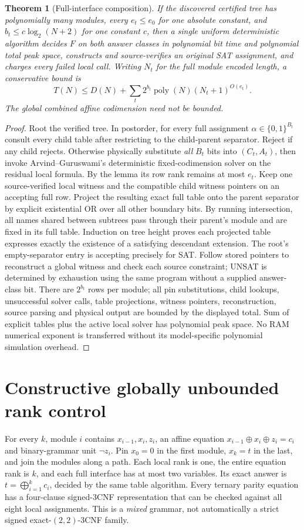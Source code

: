 \documentclass[11pt]{article}
\newtheorem{theorem}{Theorem}
\begin{document}
\begin{theorem}[Full-interface composition]
If the discovered certified tree has polynomially many modules,
every $e_t\le e_0$ for one absolute constant, and
$b_t\le c\log_2(N+2)$ for one constant $c$, then a single uniform
deterministic algorithm decides $F$ on both answer classes in polynomial
bit time and polynomial total peak space, constructs and source-verifies
an original SAT assignment, and charges every failed local call.
Writing $N_t$ for the full module encoded length, a conservative bound is
\[
T(N)\le D(N)+\sum_t 2^{b_t}\operatorname{poly}(N)(N_t+1)^{O(e_t)}.
\]
The global combined affine codimension need not be bounded.
\end{theorem}
\begin{proof}
Root the verified tree. In postorder, for every full assignment
$\alpha\in\{0,1\}^{B_t}$ consult every child table after restricting
to the child-parent separator. Reject if any child rejects. Otherwise
physically substitute \emph{all} $B_t$ bits into $(C_t,A_t)$,
then invoke Arvind--Guruswami's deterministic fixed-codimension solver
on the residual local formula. By the lemma its row rank remains
at most $e_t$. Keep one source-verified local witness and the
compatible child witness pointers on an accepting full row.
Project the resulting exact full table onto the parent separator
by explicit existential OR over all other boundary bits.
By running intersection, all names shared between subtrees pass
through their parent's module and are fixed in its full table.
Induction on tree height proves each projected table expresses
exactly the existence of a satisfying descendant extension.
The root's empty-separator entry is accepting precisely for SAT.
Follow stored pointers to reconstruct a global witness and check
each source constraint; UNSAT is determined by exhaustion using
the same program without a supplied answer-class bit.
There are $2^{b_t}$ rows per module; all pin substitutions,
child lookups, unsuccessful solver calls, table projections,
witness pointers, reconstruction, source parsing and physical
output are bounded by the displayed total. Sum of explicit
tables plus the active local solver has polynomial peak space.
No RAM numerical exponent is transferred without its
model-specific polynomial simulation overhead.
\end{proof}

\section{Constructive globally unbounded rank control}
For every $k$, module $i$ contains $x_{i-1},x_i,z_i$, an affine
equation $x_{i-1}\oplus x_i\oplus z_i=c_i$ and binary-grammar
unit $\neg z_i$. Pin $x_0=0$ in the first module, $x_k=t$ in the
last, and join the modules along a path. Each local rank is one,
the entire equation rank is $k$, and each full interface has at
most two variables. Its exact answer is
$t=\bigoplus_{i=1}^k c_i$, decided by the same table algorithm.
Every ternary parity equation has a four-clause signed-3CNF
representation that can be checked against all eight local assignments.
This is a \emph{mixed} grammar, not automatically a strict signed
exact-$(2,2)$-3CNF family.
\end{document}
